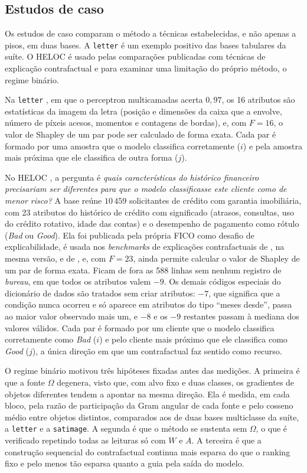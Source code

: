 \subsection{Estudos de caso}\label{subsec:estudos_caso}

Os estudos de caso comparam o método a técnicas estabelecidas, e não apenas a pisos, em duas bases. A \texttt{letter} é um exemplo positivo das bases tabulares da suíte. O HELOC é usado pelas comparações publicadas com técnicas de explicação contrafactual \citep{Guidotti2022, Wang2026} e para examinar uma limitação do próprio método, o regime binário.

Na \texttt{letter} \citep{FreySlate1991}, em que o perceptron multicamadas acerta $0{,}97$, os 16 atributos são estatísticas da imagem da letra (posição e dimensões da caixa que a envolve, número de píxeis acesos, momentos e contagens de bordas), e, com $F = 16$, o valor de Shapley de um par pode ser calculado de forma exata. Cada par é formado por uma amostra que o modelo classifica corretamente ($i$) e pela amostra mais próxima que ele classifica de outra forma ($j$).

No HELOC \citep{FICO2018}, a pergunta é \emph{quais características do histórico financeiro precisariam ser diferentes para que o modelo classificasse este cliente como de menor risco?} A base reúne $10\,459$ solicitantes de crédito com garantia imobiliária, com 23 atributos do histórico de crédito com significado (atrasos, consultas, uso do crédito rotativo, idade das contas) e o desempenho de pagamento como rótulo (\textit{Bad} ou \textit{Good}). Ela foi publicada pela própria FICO como desafio de explicabilidade, é usada nos \textit{benchmarks} de explicações contrafactuais de \citet{Guidotti2022}, na mesma versão, e de \citet{Wang2026}, e, com $F = 23$, ainda permite calcular o valor de Shapley de um par de forma exata. Ficam de fora as 588 linhas sem nenhum registro de \textit{bureau}, em que todos os atributos valem $-9$. Os demais códigos especiais do dicionário de dados são tratados sem criar atributos: $-7$, que significa que a condição nunca ocorreu e só aparece em atributos do tipo ``meses desde'', passa ao maior valor observado mais um, e $-8$ e os $-9$ restantes passam à mediana dos valores válidos. Cada par é formado por um cliente que o modelo classifica corretamente como \textit{Bad} ($i$) e pelo cliente mais próximo que ele classifica como \textit{Good} ($j$), a única direção em que um contrafactual faz sentido como recurso.

O regime binário motivou três hipóteses fixadas antes das medições. A primeira é que a fonte $\Omega$ degenera, visto que, com alvo fixo e duas classes, os gradientes de objetos diferentes tendem a apontar na mesma direção. Ela é medida, em cada bloco, pela razão de participação da Gram angular de cada fonte e pelo cosseno médio entre objetos distintos, comparados aos de duas bases multiclasse da suíte, a \texttt{letter} e a \texttt{satimage}. A segunda é que o método se sustenta sem $\Omega$, o que é verificado repetindo todas as leituras só com $W$ e $A$. A terceira é que a construção sequencial do contrafactual continua mais esparsa do que o ranking fixo e pelo menos tão esparsa quanto a guia pela saída do modelo.


